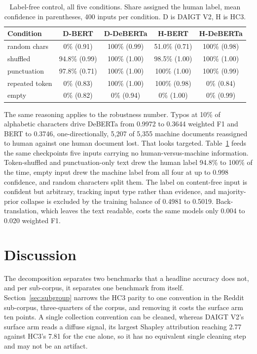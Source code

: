 \documentclass[conference,a4paper]{IEEEtran}
\newcommand{\secref}[1]{\hyperref[#1]{\ref*{#1}}}
\newcommand{\tabref}[1]{\hyperref[#1]{\ref*{#1}}}
\begin{document}
\begin{table}[!t]
\centering
\caption{Label-free control, all five conditions. Share assigned the human label, mean confidence in parentheses, 400 inputs per condition. D is DAIGT V2, H is HC3.}
\label{tab:labelfree}
\scriptsize
\setlength{\tabcolsep}{2.5pt}
\begin{tabular}{@{}lcccc@{}}
\toprule
Condition & D-BERT & D-DeBERTa & H-BERT & H-DeBERTa \\
\midrule
random chars & 0\% (0.91) & 100\% (0.99) & 51.0\% (0.71) & 100\% (0.98) \\
shuffled & 94.8\% (0.99) & 100\% (1.00) & 98.5\% (1.00) & 100\% (1.00) \\
punctuation & 97.8\% (0.71) & 100\% (1.00) & 100\% (1.00) & 100\% (0.99) \\
repeated token & 0\% (0.83) & 100\% (1.00) & 100\% (0.98) & 0\% (0.84) \\
empty & 0\% (0.82) & 0\% (0.94) & 0\% (1.00) & 0\% (0.99) \\
\bottomrule
\end{tabular}
\end{table}

The same reasoning applies to the robustness number. Typos at 10\% of alphabetic characters drive DeBERTa from 0.9972 to 0.3644 weighted F1 and BERT to 0.3746, one-directionally, 5,207 of 5,355 machine documents reassigned to human against one human document lost. That looks targeted. Table~\tabref{tab:labelfree} feeds the same checkpoints five inputs carrying no human-versus-machine information. Token-shuffled and punctuation-only text drew the human label 94.8\% to 100\% of the time, empty input drew the machine label from all four at up to 0.998 confidence, and random characters split them. The label on content-free input is confident but arbitrary, tracking input type rather than evidence, and majority-prior collapse is excluded by the training balance of 0.4981 to 0.5019. %
Back-translation, which leaves the text readable, costs the same models only 0.004 to 0.020 weighted F1.

\section{Discussion}
\label{sec:discussion}

The decomposition separates two benchmarks that a headline accuracy does not, and per sub-corpus, it separates one benchmark from itself. Section~\secref{sec:subgroup} narrows the HC3 parity to one convention in the Reddit sub-corpus, three-quarters of the corpus, and removing it costs the surface arm ten points. A single collection convention can be cleaned, whereas DAIGT V2's surface arm reads a diffuse signal, its largest Shapley attribution reaching 2.77 against HC3's 7.81 for the cue alone, so it has no equivalent single cleaning step and may not be an artifact.
\end{document}
